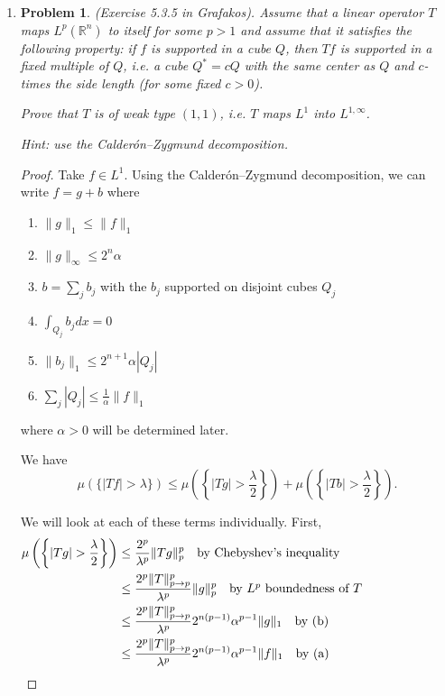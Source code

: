 \documentclass[a4paper]{article}
\newtheorem*{problem}{Problem}
\begin{document}
\begin{enumerate}
\begin{proof}
  \end{proof}

\item
  \begin{problem}
    (Exercise 5.3.5 in Grafakos). Assume that a linear operator  $ T$ maps $L^p (\mathbb R^n)$ to itself for some $p >1$ and assume that it satisfies the following property: if $f$ is supported in a cube $Q$, then $Tf$ is supported in a fixed multiple of $Q$, i.e. a cube $Q^* = c Q$ with the same center as $Q$ and $c$-times the side length (for some fixed $c>0$).

    Prove that $T$ is of weak type $(1,1)$, i.e. $T$ maps $L^1$ into $L^{1,\infty}$.

    Hint: use the Calder\'{o}n--Zygmund decomposition.
  \end{problem}

  \begin{proof}

    Take $f \in L^1$. Using the Calder\'{o}n--Zygmund decomposition, we can write $f = g+b$ where
    \begin{enumerate}
      \item $\|g\|_1 \leq \|f\|_1$
      \item $ \|g\|_\infty \leq 2^{n} \alpha$
      \item $b = \sum_j b_j$ with the $b_j$ supported on disjoint cubes $Q_j$
      \item $\int_{Q_j}^{}b_j dx = 0$
      \item $\| b_j \|_1 \leq 2^{n+1}\alpha |Q_j|$
      \item $ \sum_j |Q_j| \leq \frac{1}{\alpha} \| f \|_1$
    \end{enumerate}
    where $\alpha > 0$ will be determined later.

    We have
    \[ \mu \left( \{ |Tf| > \lambda \} \right) \leq \mu \left( \left\{ |Tg| > \frac{\lambda}{2} \right\} \right) + \mu \left( \left\{ |Tb| >
      \frac{\lambda}{2} \right\} \right) .\]

    We will look at each of these terms individually. First,
    \begin{align*}
      \mu\left( \left\{ |Tg| > \frac{\lambda}{2} \right\} \right) &\leq \frac{2^p}{\lambda^p} \|Tg\|_p^p \quad \parbox{5cm}{by Chebyshev's inequality}
      \\
      &\leq \frac{2^p \|T\|_{p \to p}^p}{\lambda^p} \|g\|_p^p \quad \parbox{5cm}{by $L^p$ boundedness of $T$} \\
      &\leq \frac{2^p \|T\|_{p \to p}^p}{\lambda^p} 2^{n(p-1)} \alpha^{p-1} \|g\|_1 \quad \parbox{5cm}{by (b)} \\
      &\leq \frac{2^p \|T\|_{p \to p}^p}{\lambda^p} 2^{n(p-1)} \alpha^{p-1} \|f\|_1 \quad \parbox{5cm}{by (a)}
    \end{align*}


\end{proof}
\end{enumerate}
\end{document}
